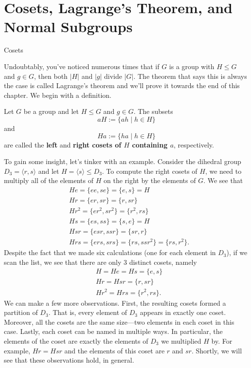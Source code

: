 \chapter{Cosets, Lagrange's Theorem, and Normal Subgroups}
\label{chapter:cosets_lagrange_normal}
\thispagestyle{empty}

\begin{section}{Cosets}

Undoubtably, you've noticed numerous times that if \(G\) is a group with \(H\leq G\) and \(g\in G\), then both \(|H|\) and \(|g|\) divide \(|G|\).  The theorem that says this is always the case is called Lagrange's theorem and we'll prove it towards the end of this chapter.  We begin with a definition.

\begin{definition}
Let \(G\) be a group and let \(H\leq G\) and \(g\in G\).  The subsets
\[
aH:=\{ah\mid h\in H\}
\]
and
\[
Ha:=\{ha\mid h\in H\}
\]
are called the \textbf{left} and \textbf{right cosets of \(H\) containing \(a\)}, respectively.
\end{definition}

To gain some insight, let's tinker with an example.  Consider the dihedral group \(D_3=\langle r,s\rangle\) and let \(H=\langle s\rangle\leq D_3\).  To compute the right cosets of \(H\), we need to multiply all of the elements of \(H\) on the right by the elements of \(G\).  We see that
\begin{align*}
& He =\{ee,se\}=\{e,s\}=H\\
& Hr=\{er,sr\}=\{r,sr\}\\
& Hr^2=\{er^2,sr^2\}=\{r^2,rs\}\\
& Hs=\{es,ss\}=\{s,e\}=H\\
& Hsr=\{esr,ssr\}=\{sr,r\}\\
& Hrs=\{ers,srs\}=\{rs,ssr^2\}=\{rs,r^2\}.
\end{align*}
Despite the fact that we made six calculations (one for each element in \(D_3\)), if we scan the list, we see that there are only 3 distinct cosets, namely
\begin{align*}
& H=He=Hs=\{e,s\}\\
& Hr=Hsr=\{r,sr\}\\
& Hr^2=Hrs=\{r^2,rs\}.
\end{align*}
We can make a few more observations.  First, the resulting cosets formed a partition of \(D_3\).  That is, every element of \(D_3\) appears in exactly one coset.  Moreover, all the cosets are the same size---two elements in each coset in this case.  Lastly, each coset can be named in multiple ways.  In particular, the elements of the coset are exactly the elements of \(D_3\) we multiplied \(H\) by.  For example, \(Hr=Hsr\) and the elements of this coset are \(r\) and \(sr\).  Shortly, we will see that these observations hold, in general.


\end{section}
